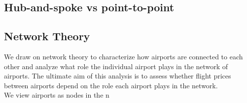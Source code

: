 \label{sec:theory}

\subsection{Hub-and-spoke vs point-to-point}


\subsection{Network Theory}
\label{subsec:Network Theory}
We draw on network theory to characterize how airports are connected to each other and analyze what role the individual airport plays in the network of airports. The ultimate aim of this analysis is to assess whether flight prices between airports depend on the role each airport plays in the network. \\
We view airports as nodes in the n



